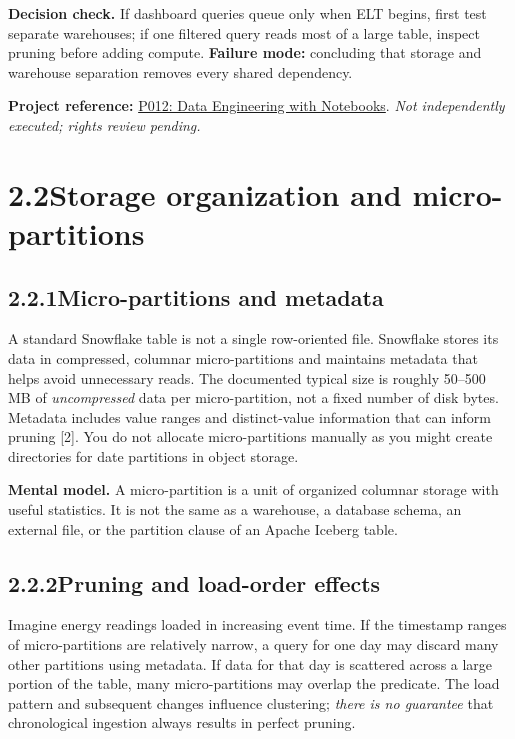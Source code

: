 \documentclass[11pt,twoside]{article}
\newcommand{\topic}[2]{\subsection*{#1\quad #2}}
\newcommand{\repo}[2]{\par\begingroup\fontsize{8.0}{9.6}\selectfont\sffamily\color{inkgray}\textbf{Project reference:} \href{#2}{#1}. \textit{Not independently executed; rights review pending.}\par\endgroup}
\begin{document}
\textbf{Decision check.} If dashboard queries queue only when ELT begins, first test separate warehouses; if one filtered query reads most of a large table, inspect pruning before adding compute. \textbf{Failure mode:} concluding that storage and warehouse separation removes every shared dependency.
\repo{P012: Data Engineering with Notebooks}{https://github.com/Snowflake-Labs/sfguide-data-engineering-with-notebooks}

\newpage
\section*{2.2\quad Storage organization and micro-partitions}
\topic{2.2.1}{Micro-partitions and metadata}
A standard Snowflake table is not a single row-oriented file. Snowflake stores its data in compressed, columnar micro-partitions and maintains metadata that helps avoid unnecessary reads. The documented typical size is roughly 50--500 MB of \emph{uncompressed} data per micro-partition, not a fixed number of disk bytes. Metadata includes value ranges and distinct-value information that can inform pruning [2]. You do not allocate micro-partitions manually as you might create directories for date partitions in object storage.

\begin{whitebox}
\textbf{Mental model.} A micro-partition is a unit of organized columnar storage with useful statistics. It is not the same as a warehouse, a database schema, an external file, or the partition clause of an Apache Iceberg table.
\end{whitebox}
\topic{2.2.2}{Pruning and load-order effects}
Imagine energy readings loaded in increasing event time. If the timestamp ranges of micro-partitions are relatively narrow, a query for one day may discard many other partitions using metadata. If data for that day is scattered across a large portion of the table, many micro-partitions may overlap the predicate. The load pattern and subsequent changes influence clustering; \emph{there is no guarantee} that chronological ingestion always results in perfect pruning.
\end{document}
